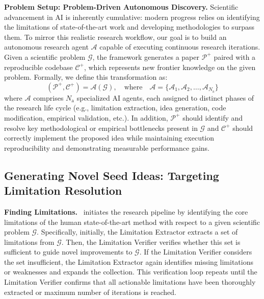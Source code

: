 \noindent\textbf{Problem Setup: Problem-Driven Autonomous Discovery.} Scientific advancement in AI is inherently cumulative: modern progress relies on identifying the limitations of state-of-the-art work and developing methodologies to surpass them. To mirror this realistic research workflow, our goal is to build an autonomous research agent $\mathcal{A}$ capable of executing continuous research iterations. Given a scientific problem $\mathcal{G}$, the framework generates a paper $\mathcal{P}^+$ paired with a reproducible codebase $\mathcal{C}^+$, which represents new frontier knowledge on the given problem. Formally, we define this transformation as:
\begin{equation}
    (\mathcal{P}^+, \mathcal{C}^+) = \mathcal{A}(\mathcal{G}), \quad \text{where} \quad \mathcal{A} = \{\mathcal{A}_1, \mathcal{A}_2, \dots, \mathcal{A}_{N_\mathrm{a}}\}
\end{equation}
where $\mathcal{A}$ comprises $N_\mathrm{a}$ specialized AI agents, each assigned to distinct phases of the research life cycle (e.g., limitation extraction, idea generation, code modification, empirical validation, etc.). 
In addition, $\mathcal{P}^+$ should identify and resolve key methodological or empirical bottlenecks present in $\mathcal{G}$ and $\mathcal{C}^+$ should correctly implement the proposed idea while maintaining execution reproducibility and demonstrating measurable performance gains.

\subsection{Generating Novel Seed Ideas: Targeting Limitation Resolution}\label{subsec:seed_idea}


\noindent\textbf{Finding Limitations.}
\sname~initiates the research pipeline by identifying the core limitations of the human state-of-the-art method with respect to a given scientific problem $\mathcal{G}$.
Specifically, initially, the Limitation Extractor extracts a set of limitations from $\mathcal{G}$.
Then, the Limitation Verifier verifies whether this set is sufficient to guide novel improvements to $\mathcal{G}$.
If the Limitation Verifier considers the set insufficient, the Limitation Extractor again identifies missing limitations or weaknesses and expands the collection.
This verification loop repeats until the Limitation Verifier confirms that all actionable limitations have been thoroughly extracted or maximum number of iterations is reached.

